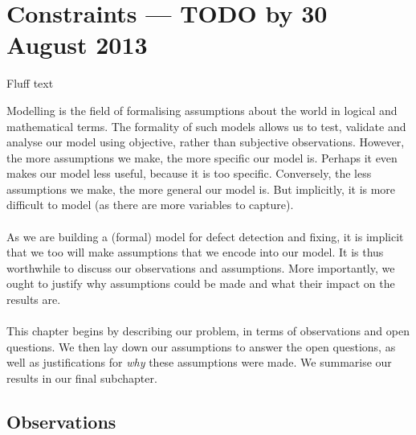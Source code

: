 \section{Constraints --- TODO by 30 August 2013}

\FIXME Fluff text

Modelling is the field of formalising assumptions about the world in logical and mathematical terms.
The formality of such models allows us to test, validate and analyse our model using objective, rather than subjective observations.
However, the more assumptions we make, the more specific our model is.
Perhaps it even makes our model less useful, because it is too specific.
Conversely, the less assumptions we make, the more general our model is.
But implicitly, it is more difficult to model (as there are more variables to capture).\\
\\
As we are building a (formal) model for defect detection and fixing, it is implicit that we too will make assumptions that we encode into our model.
It is thus worthwhile to discuss our observations and assumptions.
More importantly, we ought to justify why assumptions could be made and what their impact on the results are.\\
\\
This chapter begins by describing our problem, in terms of observations and open questions.
We then lay down our assumptions to answer the open questions, as well as justifications for {\em why} these assumptions were made.
We summarise our results in our final subchapter.

\subsection{Observations}

